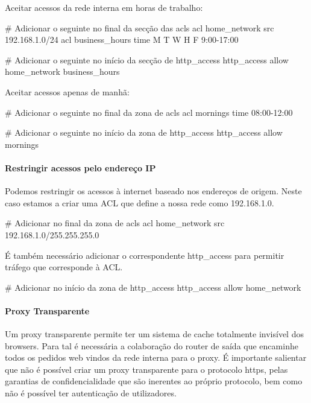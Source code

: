 Aceitar acessos da rede interna em horas de trabalho:

\begin{Output}
# Adicionar o seguinte no final da secção das acls
acl home_network src 192.168.1.0/24
acl business_hours time M T W H F 9:00-17:00

# Adicionar o seguinte no início da secção de http_access
http\_access allow home_network business_hours
\end{Output}

Aceitar acessos apenas de manhã:

\begin{Output}
# Adicionar o seguinte no final da zona de acls
acl mornings time 08:00-12:00

# Adicionar o seguinte no início da zona de http_access
http_access allow mornings
\end{Output}

\paragraph{Restringir acessos pelo endereço IP}

Podemos restringir os acessos à internet baseado nos endereços de
origem.
Neste caso estamos a criar uma ACL que define a nossa rede como
192.168.1.0.

\begin{Output}
# Adicionar no final da zona de acls
acl home_network src 192.168.1.0/255.255.255.0
\end{Output}

É também necessário adicionar o correspondente http\_access para
permitir tráfego que corresponde à ACL.

\begin{Output}
# Adicionar no início da zona de http_access
http_access allow home_network
\end{Output}

\paragraph{Proxy Transparente}

Um proxy transparente permite ter um sistema de cache totalmente
invisível dos browsers.
Para tal é necessária a colaboração do router de saída que
encaminhe todos os pedidos web vindos da rede interna para o proxy.
É importante salientar que não é possível criar um proxy
transparente para o protocolo https, pelas garantias de
confidencialidade que são inerentes ao próprio protocolo, bem como
não é possível ter autenticação de utilizadores.

